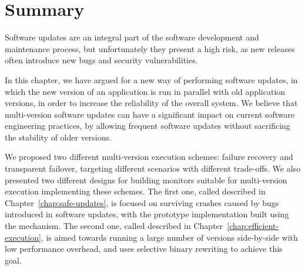 \section{Summary}
\label{multi-version:summary}

Software updates are an integral part of the software development and
maintenance process, but unfortunately they present a high risk, as new
releases often introduce new bugs and security vulnerabilities.

In this chapter, we have argued for a new way of performing software updates,
in which the new version of an application is run in parallel with old
application versions, in order to increase the reliability of the overall
system. We believe that multi-version software updates can have a significant
impact on current software engineering practices, by allowing frequent software
updates without sacrificing the stability of older versions.

We proposed two different multi-version execution schemes: failure recovery and
transparent failover, targeting different scenarios with different trade-offs.
We also presented two different designs for building monitors suitable for
multi-version execution implementing these schemes. The first one, called \mx
described in Chapter~\ref{chap:safe-updates}, is focused on surviving crashes
caused by bugs introduced in software updates, with the prototype
implementation built using the \ptrace mechanism. The second one, called \varan
described in Chapter~\ref{chap:efficient-execution}, is aimed towards running a
large number of versions side-by-side with low performance overhead, and uses
selective binary rewriting to achieve this goal. 
